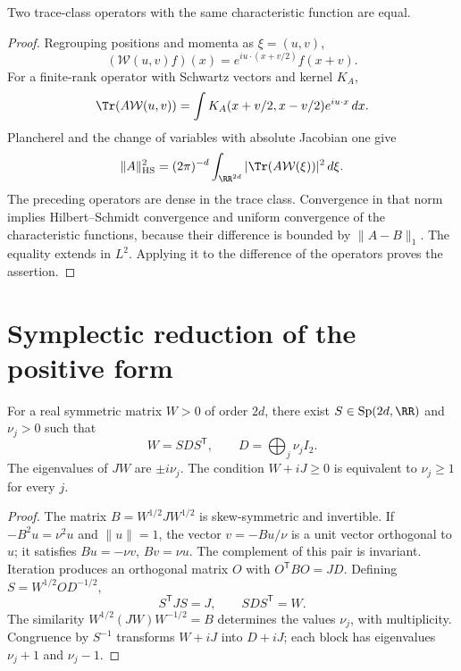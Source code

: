 \begin{lemma}
\label{x_reciprocidad:app:lem:unicidad-weyl}
Two trace-class operators with the same characteristic function are equal.
\end{lemma}
\begin{proof}
Regrouping positions and momenta as \(\xi=(u,v)\),
\[
 (\mathcal W(u,v)f)(x)=e^{iu\cdot(x+v/2)}f(x+v).
\]
For a finite-rank operator with Schwartz vectors and kernel \(K_A\),
\[
 \Tr(A\mathcal W(u,v))=\int K_A(x+v/2,x-v/2)e^{iu\cdot x}\,dx.
\]
Plancherel and the change of variables with absolute Jacobian one give
\[
 \|A\|_{\rm HS}^2=(2\pi)^{-d}\int_{\RR^{2d}}
 |\Tr(A\mathcal W(\xi))|^2\,d\xi.
\]
The preceding operators are dense in the trace class. Convergence
in that norm implies Hilbert--Schmidt convergence and uniform
convergence of the characteristic functions, because their difference is
bounded by \(\|A-B\|_1\). The equality extends in \(L^2\).
Applying it to the difference of the operators proves the assertion.
\end{proof}

\section{Symplectic reduction of the positive form}
\begin{theorem}
\label{x_reciprocidad:app:thm:williamson}
For a real symmetric matrix \(W>0\) of order \(2d\), there exist \(S\in\operatorname{Sp}(2d,\RR)\) and \(\nu_j>0\) such that
\[
 W=SDS^{\mathsf T},\qquad D=\bigoplus_j\nu_jI_2.
\]
The eigenvalues of \(JW\) are \(\pm i\nu_j\). The condition \(W+iJ\geq0\) is equivalent to \(\nu_j\geq1\) for every \(j\).
\end{theorem}
\begin{proof}
The matrix \(B=W^{1/2}JW^{1/2}\) is skew-symmetric and invertible.
If \(-B^2u=\nu^2u\) and \(\|u\|=1\), the vector
\(v=-Bu/\nu\) is a unit vector orthogonal to \(u\); it satisfies
\(Bu=-\nu v\), \(Bv=\nu u\). The complement of this pair is
invariant. Iteration produces an orthogonal matrix \(O\) with
\(O^{\mathsf T}BO=JD\). Defining \(S=W^{1/2}OD^{-1/2}\),
\[
 S^{\mathsf T}JS=J,\qquad SDS^{\mathsf T}=W.
\]
The similarity \(W^{1/2}(JW)W^{-1/2}=B\) determines the values \(\nu_j\), with multiplicity. Congruence by \(S^{-1}\) transforms \(W+iJ\) into \(D+iJ\); each block has eigenvalues \(\nu_j+1\) and \(\nu_j-1\).
\end{proof}

